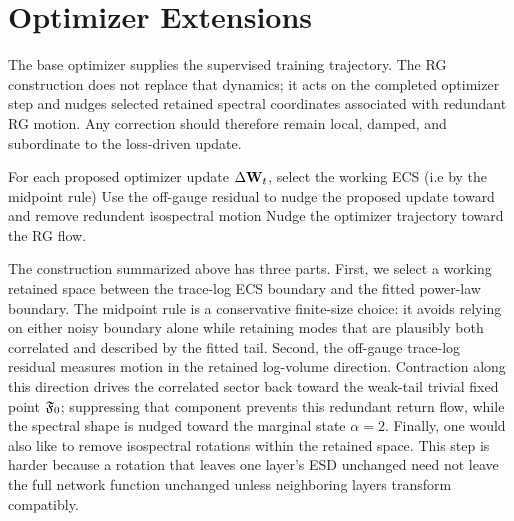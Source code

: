 \section{Optimizer Extensions}
\label{sxn:better_optimizers}


The base optimizer supplies the supervised training trajectory. The RG construction does not replace that dynamics; it acts on the completed optimizer step and nudges selected retained spectral coordinates associated with redundant RG motion. Any correction should therefore remain local, damped, and subordinate to the loss-driven update.

\begin{tcolorbox}[
  marginalbox,
  title=RG-aware correction,
  left=1.6mm,right=1.6mm,top=1.1mm,bottom=1.1mm,
  before skip=4pt,after skip=5pt
]
For each proposed optimizer update $\Delta\mathbf W_t$, select the working ECS
(i.e by the midpoint rule)
Use the off-gauge residual
to nudge the proposed update toward
and remove redundent isospectral motion
Nudge the optimizer trajectory toward the RG flow.
\end{tcolorbox}


The construction summarized above has three parts. First, we select a working retained space between the trace-log ECS boundary and the fitted power-law boundary. The midpoint rule is a conservative finite-size choice: it avoids relying on either noisy boundary alone while retaining modes that are plausibly both correlated and described by the fitted tail. Second, the off-gauge trace-log residual measures motion in the retained log-volume direction. Contraction along this direction drives the correlated sector back toward the weak-tail trivial fixed point $\mathfrak F_0$; suppressing that component prevents this redundant return flow, while the spectral shape is nudged toward the marginal state $\alpha=2$. Finally, one would also like to remove isospectral rotations within the retained space. This step is harder because a rotation that leaves one layer's ESD unchanged need not leave the full network function unchanged unless neighboring layers transform compatibly.

